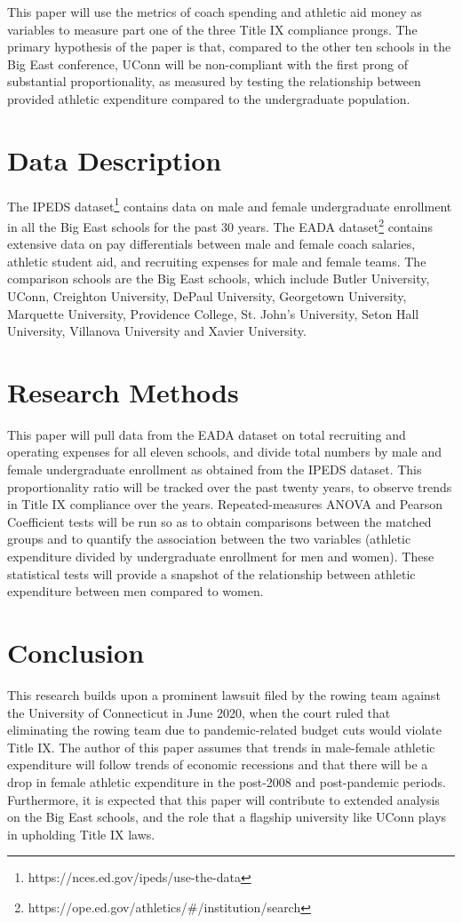 \documentclass{article}
\begin{document}
This paper will use the metrics of coach spending and athletic aid money as variables to measure part one of the three Title IX compliance prongs. The primary hypothesis of the paper is that, compared to the other ten schools in the Big East conference, UConn will be non-compliant with the first prong of substantial proportionality, as measured by testing the relationship between provided athletic expenditure compared to the undergraduate population.

\section{Data Description}

The IPEDS dataset\footnote{https://nces.ed.gov/ipeds/use-the-data} contains data on male and female undergraduate enrollment in all the Big East schools for the past 30 years. The EADA dataset\footnote{https://ope.ed.gov/athletics/#/institution/search} contains extensive data on pay differentials between male and female coach salaries, athletic student aid, and recruiting expenses for male and female teams. The comparison schools are the Big East schools, which include Butler University, UConn, Creighton University, DePaul University, Georgetown University, Marquette University, Providence College, St. John's University, Seton Hall University, Villanova University and Xavier University.

\section{Research Methods}

This paper will pull data from the EADA dataset on total recruiting and operating expenses for all eleven schools, and divide total numbers by male and female undergraduate enrollment as obtained from the IPEDS dataset. This proportionality ratio will be tracked over the past twenty years, to observe trends in Title IX compliance over the years. Repeated-measures ANOVA and Pearson Coefficient tests will be run so as to obtain comparisons between the matched groups and to quantify the association between the two variables (athletic expenditure divided by undergraduate enrollment for men and women). These statistical tests will provide a snapshot of the relationship between athletic expenditure between men compared to women.

\section{Conclusion}
This research builds upon a prominent lawsuit filed by the rowing team against the University of Connecticut in June 2020, when the court ruled that eliminating the rowing team due to pandemic-related budget cuts would violate Title IX. The author of this paper assumes that trends in male-female athletic expenditure will follow trends of economic recessions and that there will be a drop in female athletic expenditure in the post-2008 and post-pandemic periods. Furthermore, it is expected that this paper will contribute to extended analysis on the Big East schools, and the role that a flagship university like UConn plays in upholding Title IX laws.

{}

\end{document}
